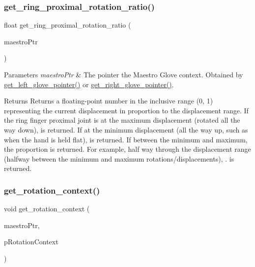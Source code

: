 \subsubsection{\texorpdfstring{get\+\_\+ring\+\_\+proximal\+\_\+rotation\+\_\+ratio()}{get\_ring\_proximal\_rotation\_ratio()}}
{\footnotesize\ttfamily float get\+\_\+ring\+\_\+proximal\+\_\+rotation\+\_\+ratio (\begin{DoxyParamCaption}\item[{intptr\+\_\+t}]{maestro\+Ptr }\end{DoxyParamCaption})}


\begin{DoxyParams}{Parameters}
{\em maestro\+Ptr} & The pointer the Maestro Glove context. Obtained by \hyperlink{group__glove_management_ga63ce3c99d4a8b8db851b22af9185764e}{get\+\_\+left\+\_\+glove\+\_\+pointer()} or \hyperlink{group__glove_management_ga9b8fd9d91aeac3f8da50f7a7eba0c32b}{get\+\_\+right\+\_\+glove\+\_\+pointer()}. \\
\hline
\end{DoxyParams}
\begin{DoxyReturn}{Returns}
Returns a floating-\/point number in the inclusive range {\ttfamily (0, 1)} representing the current displacement in proportion to the displacement range. If the ring finger proximal joint is at the maximum displacement (rotated all the way down), {} is returned. If at the minimum displacement (all the way up, such as when the hand is held flat), {} is returned. If between the minimum and maximum, the proportion is returned. For example, half way through the displacement range (halfway between the minimum and maximum rotations/displacements), {.} is returned. 
\end{DoxyReturn}
\mbox{\label{group__rotation_access_gaebc91ec820b72decfafe94a3fa34974d}} 
\subsubsection{\texorpdfstring{get\+\_\+rotation\+\_\+context()}{get\_rotation\_context()}}
{\footnotesize\ttfamily void get\+\_\+rotation\+\_\+context (\begin{DoxyParamCaption}\item[{intptr\+\_\+t}]{maestro\+Ptr,  }\item[{\hyperlink{struct_rotation_context}{Rotation\+Context} $\ast$}]{p\+Rotation\+Context }\end{DoxyParamCaption})}


